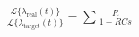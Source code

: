 \documentclass[convert={outext=.svg,density=750}]{standalone}
\begin{document}
$
    \frac{\mathcal{L}\{\lambda_{\text{real}}(t)\}}{\mathcal{L}\{\lambda_{\text{target}}(t)\}}=\sum \frac{R}{1+RCs}
$
\end{document}
